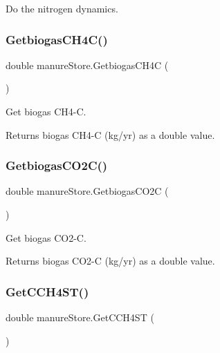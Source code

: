Do the nitrogen dynamics. 

\mbox{\label{classmanure_store_a634f58e84c82d2ef7110cd1081a41c17}} 
\subsubsection{\texorpdfstring{GetbiogasCH4C()}{GetbiogasCH4C()}}
{\footnotesize\ttfamily double manure\+Store.\+Getbiogas\+C\+H4C (\begin{DoxyParamCaption}{ }\end{DoxyParamCaption})\hspace{0.3cm}{\ttfamily [inline]}}



Get biogas C\+H4-\/C. 

\begin{DoxyReturn}{Returns}
biogas C\+H4-\/C (kg/yr) as a double value. 
\end{DoxyReturn}
\mbox{\label{classmanure_store_af22fab8168a04dc58b1867edf8156d8b}} 
\subsubsection{\texorpdfstring{GetbiogasCO2C()}{GetbiogasCO2C()}}
{\footnotesize\ttfamily double manure\+Store.\+Getbiogas\+C\+O2C (\begin{DoxyParamCaption}{ }\end{DoxyParamCaption})\hspace{0.3cm}{\ttfamily [inline]}}



Get biogas C\+O2-\/C. 

\begin{DoxyReturn}{Returns}
biogas C\+O2-\/C (kg/yr) as a double value. 
\end{DoxyReturn}
\mbox{\label{classmanure_store_aee4bfa3be452102d08a826e07e396ac5}} 
\subsubsection{\texorpdfstring{GetCCH4ST()}{GetCCH4ST()}}
{\footnotesize\ttfamily double manure\+Store.\+Get\+C\+C\+H4\+ST (\begin{DoxyParamCaption}{ }\end{DoxyParamCaption})\hspace{0.3cm}{\ttfamily [inline]}}



